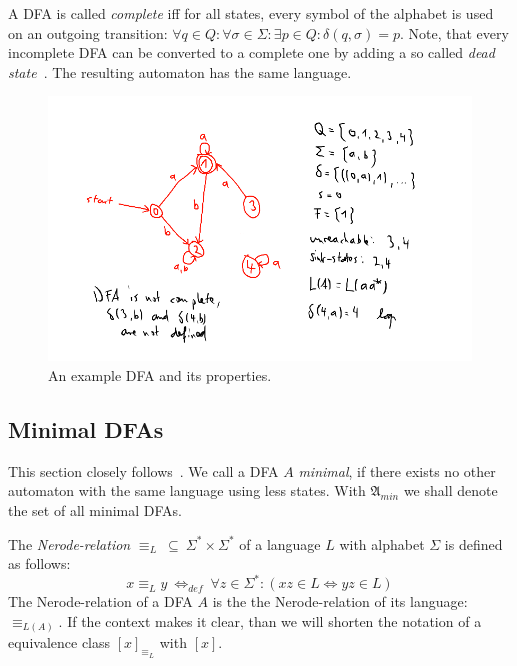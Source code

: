 A DFA is called \emph{complete} iff for all states, every symbol of the alphabet is used on an outgoing transition: $\forall q\in Q\colon \forall\sigma\in\Sigma\colon \exists p\in Q\colon \delta(q,\sigma) = p$. Note, that every incomplete DFA can be converted to a complete one by adding a so called \emph{dead state}~\cite[p. 67]{HMU01}. The resulting automaton has the same language.

\begin{figure}
	\includegraphics[width=\linewidth]{images/dfa.png}
	\caption{An example DFA and its properties.}
	\label{fig:dfa}
\end{figure}

\subsection{Minimal DFAs}

This section closely follows~\cite[pp. 42-45]{Sch01}. We call a DFA $A$ \emph{minimal}, if there exists no other automaton with the same language using less states. With $\mathfrak{A}_{min}$ we shall denote the set of all minimal DFAs.

The \emph{Nerode-relation} $\equiv_L\ \subseteq\ \Sigma^* \times \Sigma^*$ of a language $L$ with alphabet $\Sigma$ is defined as follows:
\begin{displaymath}
	x \equiv_L y\ \Leftrightarrow_{def}\ \forall z\in\Sigma^*\colon (xz\in L \Leftrightarrow yz\in L)
\end{displaymath}
The Nerode-relation of a DFA $A$ is the the Nerode-relation of its language: $\equiv_{L(A)}$. If the context makes it clear, than we will shorten the notation of a equivalence class $[x]_{\equiv_L}$ with $[x]$.

